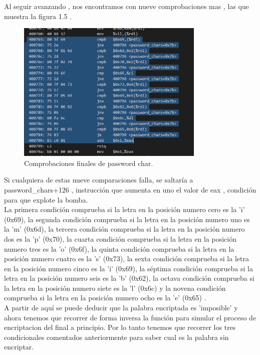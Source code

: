 	Al seguir avanzando , nos encontramos con nueve comprobaciones mas , las que muestra la figura 1.5 .
	
	\begin{figure}[htb]
		\centering
		\includegraphics[width=0.8\textwidth]{./imagenes/7}
		\caption{Comprobaciones finales de password char.} \label{fig:1}
	\end{figure}
	
	Si cualquiera de estas nueve comparaciones falla, se saltaría a password\_chars+126 , instrucción que aumenta en uno el valor de eax , condición para que explote la bomba. \\
	
	La primera condición comprueba si la letra en la posición numero cero es la 'i' (0x69), la segunda condición comprueba si la letra en la posición numero uno es la 'm' (0x6d), la tercera condición comprueba si la letra en la posición numero dos es la 'p' (0x70), la cuarta condición comprueba si la letra en la posición numero tres es la 'o' (0x6f), la quinta condición comprueba si la letra en la posición numero cuatro es la 's' (0x73), la sexta condición comprueba si la letra en la posición numero cinco es la 'i' (0x69), la séptima condición comprueba si la letra en la posición numero seis es la 'b' (0x62), la octava condición comprueba si la letra en la posición numero siete es la 'l' (0x6c) y la novena condición comprueba si la letra en la posición numero ocho es la 'e' (0x65) . \\
	
	A partir de aquí se puede deducir que la palabra encriptada es 'imposible' y ahora tenemos que recorrer de forma inversa la función   para simular el proceso de encriptacion del final a principio. Por lo tanto tenemos que recorrer los tres condicionales comentados anteriormente para saber cual es la palabra sin encriptar. \\
	

